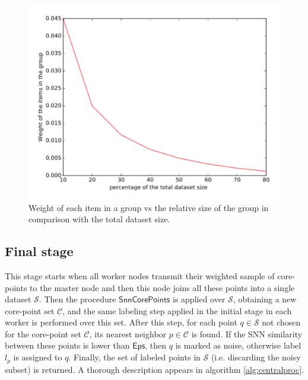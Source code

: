 \documentclass[a4paper]{article}
\newcommand*\pct{\scalebox{.9}{\%}}
\begin{document}
\begin{figure}[!htbp]
\centering
  \includegraphics[scale=0.6]{group_weights.pdf}
  \caption{Weight of each item in a group vs the relative size of the group in comparison with the total dataset size.}
  \label{fig:group_weight}
\end{figure}



\subsection*{Final stage}
This stage starts when all worker nodes transmit their weighted sample of core-points to the master node and then this node joins all these points into a single dataset $\mathcal{S}$. 
Then the procedure $\mathsf{SnnCorePoints}$ is applied over $\mathcal{S}$, obtaining a new core-point set $\mathcal{C}$, and the same labeling step applied in the initial stage in each worker is performed over this set. After this step, for each point $q\in\mathcal{S}$ not chosen for the core-point set $\mathcal{C}$, its nearest neighbor  $p\in\mathcal{C}$ is found. If the SNN similarity between these points is lower than $\mathsf{Eps}$, then $q$ is marked as noise, otherwise label $l_p$ is assigned to $q$.
Finally, the set of labeled points in $\mathcal{S}$ (i.e. discarding the noisy subset) is returned.
A thorough description appears in algorithm \ref{alg:centralproc}.
\end{document}
